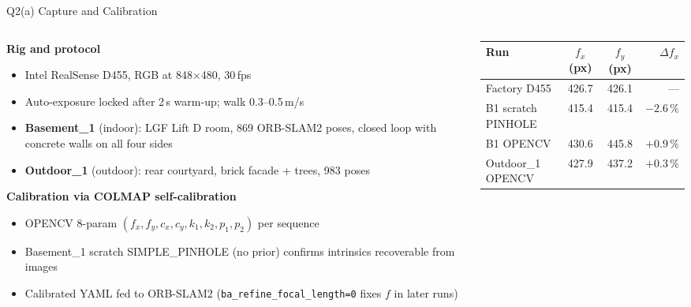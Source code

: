 \documentclass[aspectratio=169,10pt]{beamer}
\begin{document}
\begin{frame}[shrink=5]{Q2(a) Capture and Calibration}
  \begin{columns}[T]
    \begin{column}{0.50\textwidth}
      \textbf{\color{indigo}Rig and protocol}
      \begin{itemize}\small
        \item Intel RealSense D455, RGB at 848$\times$480, 30\,fps
        \item Auto-exposure locked after 2\,s warm-up; walk 0.3--0.5\,m/s
        \item \textbf{Basement\_1} (indoor): LGF Lift D room, 869 ORB-SLAM2 poses, closed loop with concrete walls on all four sides
        \item \textbf{Outdoor\_1} (outdoor): rear courtyard, brick facade + trees, 983 poses
      \end{itemize}
      \vspace{0.3em}
      \textbf{\color{indigo}Calibration via COLMAP self-calibration}
      \begin{itemize}\small
        \item OPENCV 8-param $(f_x,f_y,c_x,c_y,k_1,k_2,p_1,p_2)$ per sequence
        \item Basement\_1 scratch SIMPLE\_PINHOLE (no prior) confirms intrinsics recoverable from images
        \item Calibrated YAML fed to ORB-SLAM2 (\texttt{ba\_refine\_focal\_length=0} fixes $f$ in later runs)
      \end{itemize}
    \end{column}
    \begin{column}{0.47\textwidth}
      {\footnotesize
      \begin{tabular}{@{}lccr@{}}
        \toprule
        Run & $f_x$ (px) & $f_y$ (px) & $\Delta f_x$\\
        \midrule
        Factory D455       & 426.7 & 426.1 & ---\\
        B1 scratch PINHOLE & 415.4 & 415.4 & $-2.6\,\%$\\
        B1 OPENCV          & 430.6 & 445.8 & $+0.9\,\%$\\
        Outdoor\_1 OPENCV  & 427.9 & 437.2 & $+0.3\,\%$\\
        \bottomrule
      \end{tabular}}

\end{column}
\end{columns}
\end{frame}
\end{document}
